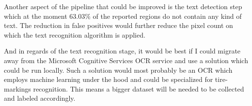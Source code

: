 Another aspect of the pipeline that could be improved is the text detection step which at the moment 63.03\% of the reported regions do not contain any kind of text. The reduction in false positives would further reduce the pixel count on which the text recognition algorithm is applied.

And in regards of the text recognition stage, it would be best if I could migrate away from the Microsoft Cognitive Services OCR service and use a solution which could be run locally. Such a solution would most probably be an OCR which employs machine learning under the hood and could be specialized for tire-markings recognition. This means a bigger dataset will be needed to be collected and labeled accordingly.
